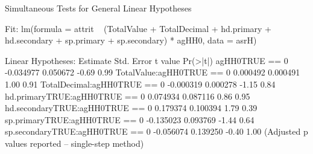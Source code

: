 \begin{Schunk}
\begin{Soutput}
	 Simultaneous Tests for General Linear Hypotheses

Fit: lm(formula = attrit ~ (TotalValue + TotalDecimal + hd.primary + 
    hd.secondary + sp.primary + sp.secondary) * agHH0, data = asrH)

Linear Hypotheses:
                                 Estimate Std. Error t value Pr(>|t|)
agHH0TRUE == 0                  -0.034977   0.050672   -0.69     0.99
TotalValue:agHH0TRUE == 0        0.000492   0.000491    1.00     0.91
TotalDecimal:agHH0TRUE == 0     -0.000319   0.000278   -1.15     0.84
hd.primaryTRUE:agHH0TRUE == 0    0.074934   0.087116    0.86     0.95
hd.secondaryTRUE:agHH0TRUE == 0  0.179374   0.100394    1.79     0.39
sp.primaryTRUE:agHH0TRUE == 0   -0.135023   0.093769   -1.44     0.64
sp.secondaryTRUE:agHH0TRUE == 0 -0.056074   0.139250   -0.40     1.00
(Adjusted p values reported -- single-step method)
\end{Soutput}
\end{Schunk}
